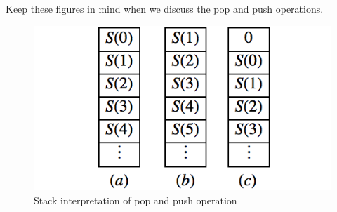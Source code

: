 \documentclass[10pt,]{book}
\theoremstyle{plain}
\theoremstyle{definition}
\theoremstyle{definition}
\theoremstyle{definition}
\theoremstyle{definition}
\numberwithin{equation}{section}
\begin{document}
Keep these figures in mind when we discuss the pop and push operations.%
\leavevmode%
\begin{figure}
\centering
\includegraphics[width=1\linewidth]{images/fig-pop-push.png}
\caption{Stack interpretation of pop and push operation\label{fig-pop-push}}
\end{figure}
\end{document}
